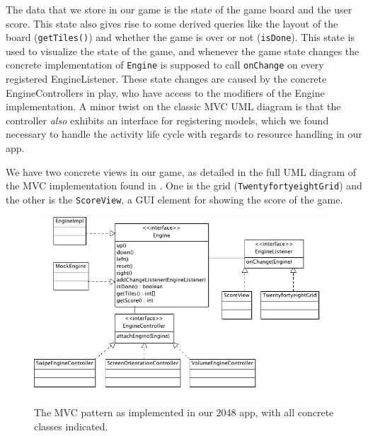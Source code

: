 \documentclass[a4paper, 12pt]{article}
\newcommand{\code}[1]{\texttt{#1}}
\begin{document}
The data that we store in our game is the state of the game board and
the user score. This state also gives rise to some derived queries
like the layout of the board (\code{getTiles()}) and whether the game
is over or not (\code{isDone}). This state is used to visualize the
state of the game, and whenever the game state changes the concrete
implementation of \code{Engine} is supposed to call \code{onChange} on
every registered EngineListener. These state changes are caused by the
concrete EngineControllers in play, who have access to the modifiers
of the Engine implementation. A minor twist on the classic MVC UML
diagram is that the controller \emph{also} exhibits an interface for
registering models, which we found necessary to handle the activity
life cycle with regards to resource handling in our app.

We have two  concrete views in our  game, as detailed in  the full UML
diagram of the MVC  implementation found in \label{fig:mvc-2.png}. One
is  the  grid  (\code{TwentyfortyeightGrid})  and  the  other  is  the
\code{ScoreView}, a GUI element for showing the score of the game. 

\begin{figure}[!h]
  \includegraphics[width=\linewidth]{mvc-2.png}
  \caption{The MVC pattern as implemented in our 2048 app, with all
    concrete classes indicated.}
  \label{fig:mvc-2.png}
\end{figure}
\end{document}
